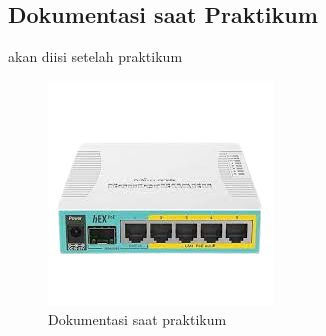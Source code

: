 \subsection{Dokumentasi saat Praktikum}
akan diisi setelah praktikum
\begin{figure}[H]
	\centering
	\includegraphics[width=0.75\linewidth]{P1/img/contoh.png}
	\caption{Dokumentasi saat praktikum}
	\label{fig:gambar32}
\end{figure}
